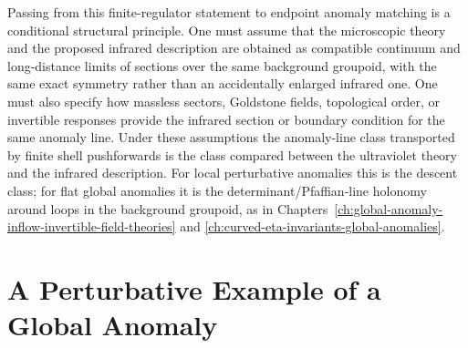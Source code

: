\begin{remark}
Passing from this finite-regulator statement to endpoint anomaly matching is a
conditional structural principle.  One must assume that the microscopic theory
and the proposed infrared description are obtained as compatible continuum and
long-distance limits of sections over the same background groupoid, with the
same exact symmetry rather than an accidentally enlarged infrared one.  One
must also specify how massless sectors, Goldstone fields, topological order, or
invertible responses provide the infrared section or boundary condition for
the same anomaly line.  Under these assumptions the anomaly-line class
transported by finite shell pushforwards is the class compared between the
ultraviolet theory and the infrared description.  For local perturbative
anomalies this is the descent class; for flat global anomalies it is the
determinant/Pfaffian-line holonomy around loops in the background groupoid, as
in Chapters~\ref{ch:global-anomaly-inflow-invertible-field-theories} and
\ref{ch:curved-eta-invariants-global-anomalies}.
\end{remark}

\section{A Perturbative Example of a Global Anomaly}

